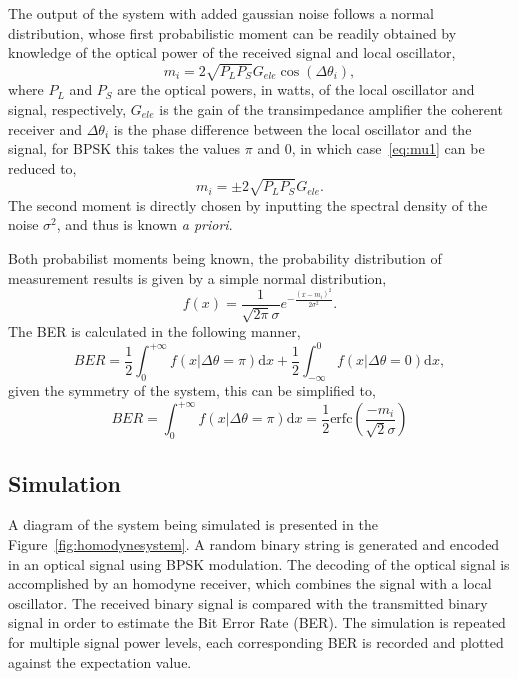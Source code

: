 The output of the system with added gaussian noise follows a normal distribution, whose first probabilistic moment can be readily obtained by knowledge of the optical power of the received signal and local oscillator,
\begin{equation}\label{eq:mu1}
m_i=2\sqrt{P_LP_S}G_{ele}\cos(\Delta\theta_i),
\end{equation}
where $P_L$ and $P_S$ are the optical powers, in watts, of the local oscillator and signal, respectively, $G_{ele}$ is the gain of the transimpedance amplifier the coherent receiver and $\Delta\theta_i$ is the phase difference between the local oscillator and the signal, for BPSK this takes the values $\pi$ and 0, in which case~\eqref{eq:mu1} can be reduced to,
\begin{equation}
m_i=\pm2\sqrt{P_LP_S}G_{ele}.
\end{equation}
The second moment is directly chosen by inputting the spectral density of the noise $\sigma^2$, and thus is known \textit{a priori}.
\par
Both probabilist moments being known, the probability distribution of measurement results is given by a simple normal distribution,
\begin{equation}
f(x)=\frac{1}{\sqrt{2\pi}\sigma}e^{-\frac{(x-m_i)^2}{2\sigma^2}}.
\end{equation}
The BER is calculated in the following manner,
\begin{equation}
BER=\frac{1}{2}\int_0^{+\infty}f(x|\Delta\theta=\pi)\text{d}x+\frac{1}{2}\int^0_{-\infty}f(x|\Delta\theta=0)\text{d}x,
\end{equation}
given the symmetry of the system, this can be simplified to,
\begin{equation}\label{eq:BERtheoretical}
BER=\int_0^{+\infty}f(x|\Delta\theta=\pi)\text{d}x=\frac{1}{2}\text{erfc}\left(\frac{-m_i}{\sqrt{2}\sigma}\right)
\end{equation}

\subsection{Simulation}

A diagram of the system being simulated is presented in the Figure~\ref{fig:homodynesystem}. A random binary string is generated and encoded in an optical signal using BPSK modulation. The decoding of the optical signal is accomplished by an homodyne receiver, which combines the signal with a local oscillator. The received binary signal is compared with the transmitted binary signal in order to estimate the Bit Error Rate (BER). The simulation is repeated for multiple signal power levels, each corresponding BER is recorded and plotted against the expectation value.

